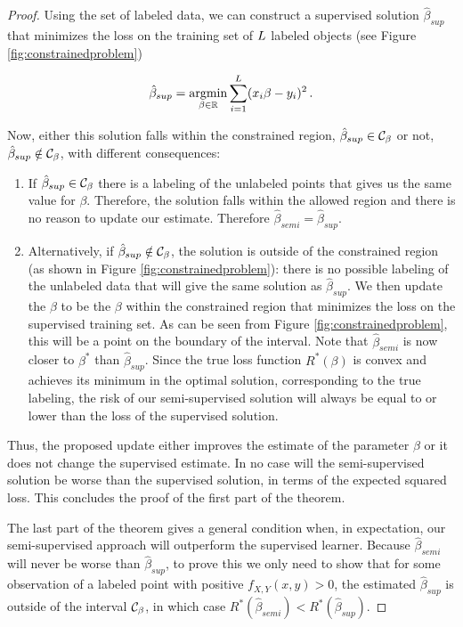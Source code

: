 \documentclass{elsarticle}
\begin{document}
\begin{proof}
Using the set of labeled data, we can construct a supervised solution $\hat{\beta}_{sup}$ that minimizes the loss on the training set of $L$ labeled objects (see Figure \ref{fig:constrainedproblem})

\begin{equation} \label{supervisedsolution}
\hat{\beta}_{sup} = \operatorname*{argmin}_{\beta \in \mathbb{R}} \sum_{i=1}^{L} (x_i \beta - y_i)^2 \, .
\end{equation}

Now, either this solution falls within the constrained region, $\hat{\beta}_{sup} \in \mathcal{C}_{\beta}$ or not, $\hat{\beta}_{sup} \notin \mathcal{C}_{\beta}$, with different consequences:

\begin{enumerate}
  \item If $\hat{\beta}_{sup} \in \mathcal{C}_{\beta}$ there is a labeling of the unlabeled points that gives us the same value for $\beta$. Therefore, the solution falls within the allowed region and there is no reason to update our estimate. Therefore $\hat{\beta}_{semi}=\hat{\beta}_{sup}$.
  \item Alternatively, if $\hat{\beta}_{sup} \notin  \mathcal{C}_{\beta}$, the solution is outside of the constrained region (as shown in Figure \ref{fig:constrainedproblem}): there is no possible labeling of the unlabeled data that will give the same solution as $\hat{\beta}_{sup}$. We then update the $\beta$ to be the $\beta$ within the constrained region that minimizes the loss on the supervised training set. As can be seen from Figure \ref{fig:constrainedproblem}, this will be a point on the boundary of the interval. Note that $\hat{\beta}_{semi}$ is now closer to $\beta^{*}$ than $\hat{\beta}_{sup}$. Since the true loss function $R^*(\beta)$ is convex  and achieves its minimum in the optimal solution, corresponding to the true labeling, the risk of our semi-supervised solution will always be equal to or lower than the loss of the supervised solution.
\end{enumerate}

Thus, the proposed update either improves the estimate of the parameter $\beta$ or it does not change the supervised estimate. In no case will the semi-supervised solution be worse than the supervised solution, in terms of the expected squared loss. This concludes the proof of the first part of the theorem.

The last part of the theorem gives a general condition when, in expectation, our semi-supervised approach will outperform the supervised learner. Because $\hat{\beta}_{semi}$ will never be worse than $\hat{\beta}_{sup}$, to prove this we only need to show that for some observation of a labeled point with positive $f_{X,Y}(x,y)>0$, the estimated $\hat{\beta}_{sup}$ is outside of the interval $\mathcal{C}_{\beta}$, in which case $R^*(\hat{\beta}_{semi}) < R^*(\hat{\beta}_{sup})$. 


\end{proof}
\end{document}
